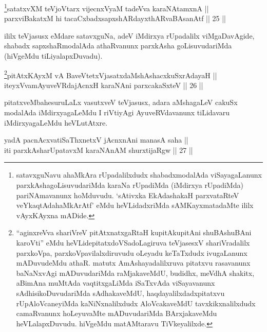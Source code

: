 \begin{shl}
\footnote{satavxguNavu ahaMkAra rUpadalilxdudx shabadxmodalAda viSayagaLanunx parxkAshagoLisuvudariMda karaNa rUpadiMda (iMdirxya rUpadiMda) pariNAmavanunx hoMduvudu. `sAtivxka EkAdashakaH parxvataRteV veYkaqtAdahaMkArAtf' eMdu heVLidadxriMda sAMKayxmatadaMte ililx vAyxKAyxna mADide.}satatxvXM teVjoV\s tarx vijecnxVyaM tadeVva karaNAtamxnA || \\
parxviBakatxM hi tacaCxbadxsapxshARdayxthARvaBAsanAtf \hfill || 25 ||
  
\end{shl}

\begin{artha}
ililx teVjasusx eMdare satavxguNa, adeV iMdirxya
rUpadalilx viMgaDavAgide, shabadx sapxshaRmodalAda athaRvanunx
parxkAsha goLisuvuda\-riMda (hiVgeMdu tiLiyalapxDuvadu).
\end{artha}


\begin{shl}
\footnote{``aginxreVva shariVreV pitAtxnatxgaRtaH kupitAkupitAni shuBAshuBAni karoVti'' eMdu heVLide\break pitatxdoVSadoLagiruva teVjasesxV shariVradalilx parxkoVpa, parxkoVpavilalxdiruvudu oLeyadu keTaTxdudx ivugaLanunx mADuvudeMdu athaR. matutx AmAshayadalilxruva pitatxvu rasavanunx baNaNxvAgi mADuvudariMda raMjakaveMdU, budidhx, meVdhA shakitx, aBimAna muMtAda vaqtitxgaLiMda iSaTxvAda viSayavanunx sAdhisikoDuvudariMda sAdhakaveMdU, haqdayalilxdadxpitatxvu rUpAloVcaneyiMda kaNiNxnalilxdudx AloVcakaveMdU tavxkikxnalilxdudx camaRvanunx hoLeyuvaMte mADuvudariMda BArxjakaveMdu heVLalapxDuvudu. hiVgeMdu matAMtaravu TiVkeyalilxde.}pitAtxKAyxM vA BaveVtetxVjasatxdaMshAshacxkuSxrAdayaH ||  \\
iteyxVvamAyuveVRdajAcnxH karaNAni parxcakaSxteV \hfill || 26 ||

\end{shl}

\begin{artha}
pitatxveMbahesuruLaLx vasutxveV teVjasusx, adara aMshagaLeV cakuSx
modalAda iMdirxyagaLeMdu I riVtiyAgi AyuveRVdavanunx tiLidavaru
iMdirxyagaLeMdu heVLutAtxre.
\end{artha}


\begin{shl}
yadA pacnAcxvatiSaThxnetxV jAcnxnAni manasA saha || \\
iti parxkAsharUpatavxM karaNAnAM shurxtijaRgw \hfill || 27 ||
  
\end{shl}

